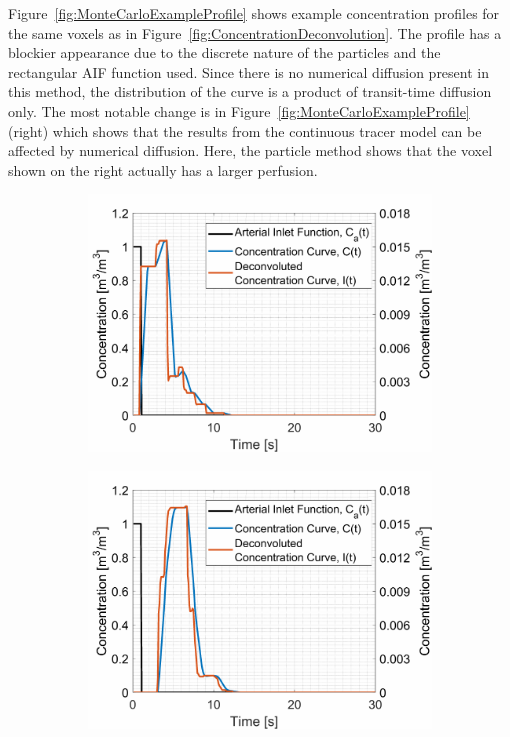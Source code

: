 \documentclass[11pt,english,a4paper,twoside,openright]{report}
\begin{document}
{{{{{{{Figure~\ref{fig:MonteCarloExampleProfile} shows example concentration profiles for the same voxels as in Figure~\ref{fig:ConcentrationDeconvolution}. The profile has a blockier appearance due to the discrete nature of the particles and the rectangular AIF function used. Since there is no numerical diffusion present in this method, the distribution of the curve is a product of transit-time diffusion only. The most notable change is in Figure~\ref{fig:MonteCarloExampleProfile} (right) which shows that the results from the continuous tracer model can be affected by numerical diffusion. Here, the particle method shows that the voxel shown on the right actually has a larger perfusion. 

\begin{figure}[h]
	\centering
	\begin{subfigure}[b]{0.49\textwidth}
		\includegraphics[width=\textwidth]{Chapter4/ConcentrationDeconvolution_MonteCarlo}
	\end{subfigure}
	\begin{subfigure}[b]{0.49\textwidth}
		\includegraphics[width=\textwidth]{Chapter4/ConcentrationDeconvolution2_MonteCarlo}
	\end{subfigure}
	

\end{figure}}}}}}}}
\end{document}
